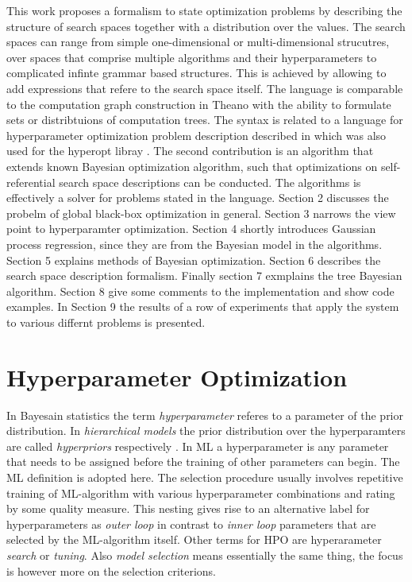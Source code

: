 \documentclass[english]{article}
\begin{document}
This work proposes a formalism to state optimization problems by describing the structure of search spaces together with a distribution over the values. The search spaces can range from simple one-dimensional or multi-dimensional strucutres, over spaces that comprise multiple algorithms and their hyperparameters to complicated infinte grammar based structures. This is achieved by allowing to add expressions that refere to the search space itself. The language is comparable to the computation graph construction in Theano with the ability to formulate sets or distribtuions of computation trees. The syntax is related to a language for hyperparameter optimization problem description described in \cite{bergstra_making_2013} which was also used for the hyperopt libray \cite{bergstra_hyperopt:_2013}. The second contribution is an algorithm that extends known Bayesian optimization algorithm, such that optimizations on self-referential search space descriptions can be conducted. The algorithms is effectively a solver for problems stated in the language.
Section 2 discusses the probelm of global black-box optimization in general. Section 3 narrows the view point to hyperparamter optimization.
Section 4 shortly introduces Gaussian process regression, since they are from the Bayesian model in the algorithms.
Section 5 explains methods of Bayesian optimization.
Section 6 describes the search space description formalism.
Finally section 7 exmplains the tree Bayesian algorithm.
Section 8 give some comments to the implementation and show code examples.
In Section 9 the results of a row of experiments that apply the system to various differnt problems is presented.

\newpage

\section{Hyperparameter Optimization}
In Bayesain statistics the term \textit{hyperparameter} referes to a parameter of the prior distribution. In \textit{hierarchical models} the prior distribution over the hyperparamters are called \textit{hyperpriors} respectively \cite[p.408]{bishop_neural_1995}. In ML a hyperparameter is any parameter that needs to be assigned before the training of other parameters can begin. The ML definition is adopted here. The selection procedure usually involves repetitive training of ML-algorithm with various hyperparameter combinations and rating by some quality measure. This nesting gives rise to an alternative label for hyperparameters as \textit{outer loop} in contrast to \textit{inner loop} parameters that are selected by the ML-algorithm itself. Other terms for HPO are hyperarameter \textit{search} or \textit{tuning}.
Also \textit{model selection} means essentially the same thing, the focus is however more on the selection criterions.
\end{document}
